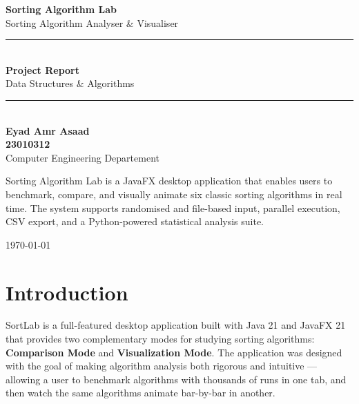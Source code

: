 \documentclass[12pt,a4paper]{article}
\begin{document}

\begin{titlepage}
    \centering
    \vspace*{2cm}

    {\Huge\bfseries\color{primary} Sorting Algorithm Lab}\\[0.5em]
    {\Large\color{muted} Sorting Algorithm Analyser \& Visualiser}\\[3em]

    \rule{\textwidth}{0.5pt}\\[1em]
    {\large\bfseries Project Report}\\[0.5em]
    {\normalsize Data Structures \& Algorithms}\\
    \rule{\textwidth}{0.5pt}\\[3em]

    {\large\textbf{Eyad Amr Asaad}}\\[0.5em]
     {\large\textbf{23010312}}\\[0.5em]
    {\color{muted} Computer Engineering Departement}\\[3em]

    \vfill

    \begin{infobox}[title=Project Summary]
        Sorting Algorithm Lab is a JavaFX desktop application that enables users to benchmark,
        compare, and visually animate six classic sorting algorithms in real time.
        The system supports randomised and file-based input, parallel execution,
        CSV export, and a Python-powered statistical analysis suite.
    \end{infobox}

    \vspace{2em}
    {\color{muted}\today}
\end{titlepage}

\tableofcontents
\newpage

\section{Introduction}

SortLab is a full-featured desktop application built with Java 21 and JavaFX 21
that provides two complementary modes for studying sorting algorithms:
\textbf{Comparison Mode} and \textbf{Visualization Mode}. The application was
designed with the goal of making algorithm analysis both rigorous and intuitive —
allowing a user to benchmark algorithms with thousands of runs in one tab, and
then watch the same algorithms animate bar-by-bar in another.
\end{document}
